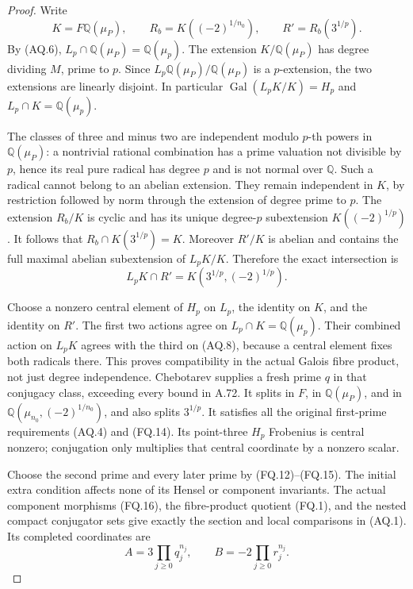 \begin{proof}
Write
\[
 K=F\mathbb Q(\mu_P),\qquad
 R_b=K((-2)^{1/n_0}),\qquad
 R'=R_b(3^{1/p}).
 \tag{AQ.7}
\]
By (AQ.6), \(L_p\cap\mathbb Q(\mu_P)=\mathbb Q(\mu_p)\).
The extension \(K/\mathbb Q(\mu_P)\) has degree
dividing \(M\), prime to \(p\).
Since \(L_p\mathbb Q(\mu_P)/\mathbb Q(\mu_P)\)
is a \(p\)-extension, the two extensions are
linearly disjoint. In particular
\(\operatorname{Gal}(L_pK/K)=H_p\) and
\(L_p\cap K=\mathbb Q(\mu_p)\).

The classes of three and minus two are independent
modulo \(p\)-th powers in \(\mathbb Q(\mu_P)\):
a nontrivial rational combination has a prime
valuation not divisible by \(p\), hence its real
pure radical has degree \(p\) and is not normal
over \(\mathbb Q\). Such a radical cannot belong
to an abelian extension. They remain independent
in \(K\), by restriction followed by norm through
the extension of degree prime to \(p\).
The extension \(R_b/K\) is cyclic and has its
unique degree-\(p\) subextension
\(K((-2)^{1/p})\).
It follows that
\(R_b\cap K(3^{1/p})=K\).
Moreover \(R'/K\) is abelian and contains the
full maximal abelian subextension of \(L_pK/K\).
Therefore the exact intersection is
\[
 L_pK\cap R'=K(3^{1/p},(-2)^{1/p}).
 \tag{AQ.8}
\]

Choose a nonzero central element of \(H_p\)
on \(L_p\), the identity on \(K\), and the identity
on \(R'\).
The first two actions agree on
\(L_p\cap K=\mathbb Q(\mu_p)\).
Their combined action on \(L_pK\) agrees with
the third on (AQ.8), because a central element
fixes both radicals there.
This proves compatibility in the actual
Galois fibre product, not just degree independence.
Chebotarev \cite[Theorem 8.31]{GhostMilneANT}
supplies a fresh prime \(q\) in that conjugacy
class, exceeding every bound in A.72.
It splits in \(F\), in \(\mathbb Q(\mu_P)\),
and in \(\mathbb Q(\mu_{n_0},(-2)^{1/n_0})\),
and also splits \(3^{1/p}\).
It satisfies all the original first-prime
requirements (AQ.4) and (FQ.14).
Its point-three \(H_p\) Frobenius is central
nonzero; conjugation only multiplies that
central coordinate by a nonzero scalar.

Choose the second prime and every later prime
by (FQ.12)--(FQ.15).
The initial extra condition affects none of
its Hensel or component invariants.
The actual component morphisms (FQ.16),
the fibre-product quotient (FQ.1), and the
nested compact conjugator sets give exactly
the section and local comparisons in (AQ.1).
Its completed coordinates are
\[
 A=3\prod_{j\ge0}q_j^{n_j},\qquad
 B=-2\prod_{j\ge0}r_j^{n_j}.
 \tag{AQ.9}
\]


\end{proof}
